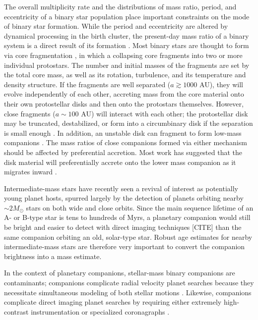\documentclass{utthesis}
\begin{document}
The overall multiplicity rate and the distributions of mass ratio, period, and eccentricity of a binary star population place important constraints on the mode of binary star formation. While the period and eccentricity are altered by dynamical processing in the birth cluster, the present-day mass ratio of a binary system is a direct result of its formation \citep{Parker2013}. Most binary stars are thought to form via core fragmentation \citep{Boss1979, Boss1986, Bate1995}, in which a collapsing core fragments into two or more individual protostars. The number and initial masses of the fragments are set by the total core mass, as well as its rotation, turbulence, and its temperature and density structure. If the fragments are well separated ($a \gtrsim 1000$ AU), they will evolve independently of each other, accreting mass from the core material onto their own protostellar disks and then onto the protostars themselves. However, close fragments ($a \sim 100$ AU) will interact with each other; the protostellar disk may be truncated, destabilized, or form into a circumbinary disk if the separation is small enough \citep{Bate1997}. In addition, an unstable disk can fragment to form low-mass companions \citep{Kratter2006, Stamatellos2011}. The mass ratios of close companions formed via either mechanism should be affected by preferential accretion. Most work has suggested that the disk material will preferentially accrete onto the lower mass companion as it migrates inward \citep{Bate1997, BBB2002}.

Intermediate-mass stars have recently seen a revival of interest as potentially young planet hosts, spurred largely by the detection of planets orbiting nearby \mbox{$\sim2 M_{\odot}$} stars on both wide \citep[e.g.][]{Lagrange2010, Marois2008} and close \citep{Johnson2011} orbits. Since the main sequence lifetime of an A- or B-type star is tens to hundreds of Myrs, a planetary companion would still be bright and easier to detect with direct imaging techniques [CITE] than the same companion orbiting an old, solar-type star. Robust age estimates for nearby intermediate-mass stars are therefore very important to convert the companion brightness into a mass estimate. 

In the context of planetary companions, stellar-mass binary companions are contaminants; companions complicate radial velocity planet searches because they necessitate simultaneous modeling of both stellar motions \citep[e.g.][]{Bergmann2015}. Likewise, companions complicate direct imaging planet searches by requiring either extremely high-contrast instrumentation \citep{Thalmann2014} or specialized coronagraphs \citep{Crepp2010}. 
\end{document}
